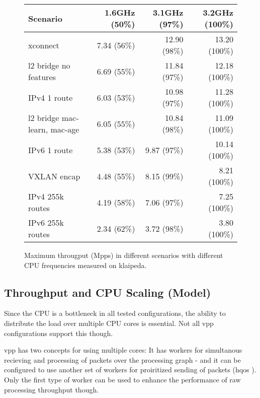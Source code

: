 \begin{figure}[!ht]
	\vspace{5ex}
	\begin{tabular}[]{ l r r r }
		Scenario & 1.6GHz (50\%) & 3.1GHz (97\%)  & 3.2GHz (100\%) \\ 
		\midrule
		xconnect & 7.34 (56\%) & 12.90 (98\%) & 13.20 (100\%) \\ %
		l2 bridge no features & 6.69 (55\%) & 11.84 (97\%) & 12.18 (100\%) \\ %
		IPv4 1 route & 6.03 (53\%) & 10.98 (97\%) & 11.28 (100\%) \\ %
		l2 bridge mac-learn, mac-age & 6.05 (55\%) & 10.84 (98\%) & 11.09 (100\%) \\ %
		IPv6 1 route & 5.38 (53\%) & 9.87 (97\%) & 10.14 (100\%) \\ %
		VXLAN encap & 4.48 (55\%) & 8.15 (99\%) & 8.21 (100\%) \\ %
		IPv4 255k routes & 4.19 (58\%) & 7.06 (97\%) & 7.25 (100\%) \\ %
		IPv6 255k routes & 2.34 (62\%) & 3.72 (98\%) & 3.80 (100\%) \\ %
		\midrule
	\end{tabular}
	\caption{Maximum througput (Mpps) in different scenarios with different CPU frequencies measured on klaipeda. }
	\label{bottleneck}
\end{figure}


\subsection{Throughput and CPU Scaling (Model)}

Since the CPU is a bottleneck in all tested configurations, the
ability to distribute the load over multiple CPU cores is
essential. Not all \Ac{vpp} configurations support this though.

\Ac{vpp} has two concepts for using multiple cores: It has workers for
simultanous recieving and processing of packets over the processing
graph - and it can be configured to use another set of workers for
proiritized sending of packets (\Ac{hqos} \cite{vppdocs:qos}
\cite{vppdocs:hqosplacement}). Only the first type of worker can be
used to enhance the performance of raw processing throughput though.

